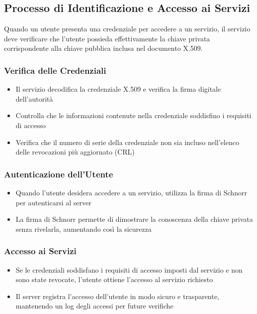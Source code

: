     
        \subsection{Processo di Identificazione e Accesso ai Servizi}
            Quando un utente presenta una credenziale per accedere a un servizio, il servizio deve verificare che l'utente possieda effettivamente la chiave privata corrispondente alla chiave pubblica inclusa nel documento X.509.
    
            \subsubsection{Verifica delle Credenziali}
                \begin{itemize}
                    \item Il servizio decodifica la credenziale X.509 e verifica la firma digitale dell'autorità
    
                    \item Controlla che le informazioni contenute nella credenziale soddisfino i requisiti di accesso
    
                    \item Verifica che il numero di serie della credenziale non sia incluso nell'elenco delle revocazioni più aggiornato (CRL)
                \end{itemize}
    
            \subsubsection{Autenticazione dell'Utente}
                \begin{itemize}
                    \item Quando l'utente desidera accedere a un servizio, utilizza la firma di Schnorr per autenticarsi al server
    
                    \item La firma di Schnorr permette di dimostrare la conoscenza della chiave privata senza rivelarla, aumentando così la sicurezza
                \end{itemize}
    
            \subsubsection{Accesso ai Servizi}
                \begin{itemize}
                    \item Se le credenziali soddisfano i requisiti di accesso imposti dal servizio e non sono state revocate, l'utente ottiene l'accesso al servizio richiesto
                    
                    \item Il server registra l'accesso dell'utente in modo sicuro e trasparente, mantenendo un log degli accessi per future verifiche
                \end{itemize}
    
